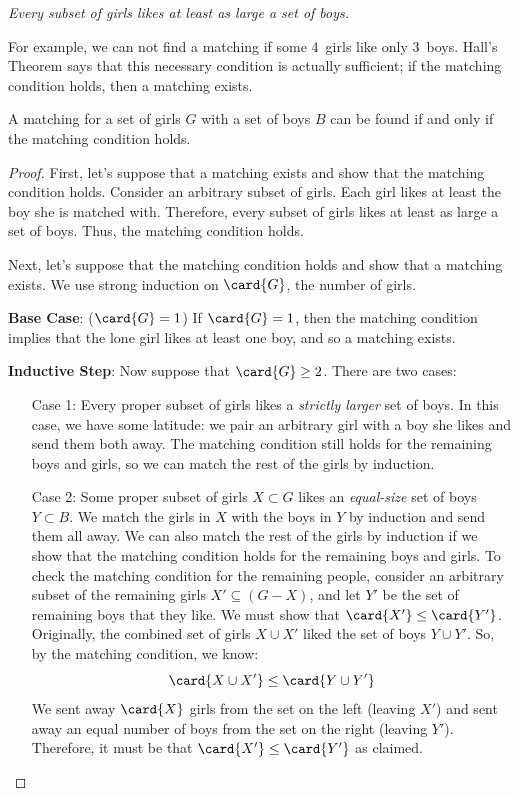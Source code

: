 \bigskip
\begin{center}
\emph{Every subset of girls likes at least as large a set of boys.}
\end{center}
\bigskip

For example, we can not find a matching if some 4~girls like only 3~boys.
Hall's Theorem says that this necessary condition is actually sufficient;
if the matching condition holds, then a matching exists.

\begin{theorem}
A matching for a set of girls $G$ with a set of boys $B$ can be found if
and only if the matching condition holds.
\end{theorem}

\begin{proof}
First, let's suppose that a matching exists and show that the matching condition
holds.  Consider an arbitrary subset of girls.  Each girl likes at least the boy she
is matched with.  Therefore, every subset of girls likes at least as large a set of
boys.  Thus, the matching condition holds.

Next, let's suppose that the matching condition holds and show that a matching
exists.  We use strong induction on $\card{G}$, the number of girls.

\textbf{Base Case}: ($\card{G}=1$) If $\card{G} = 1$, then the 
matching condition implies that the lone girl likes at least one boy, and so a
matching exists.

\textbf{Inductive Step}: Now suppose that $\card{G} \geq 2$.  There are two cases:

\begin{itemize}

\item[Case 1:] Every proper subset of girls likes a \emph{strictly larger} set of
  boys.  In this case, we have some latitude: we pair an arbitrary girl with a boy
  she likes and send them both away.  The matching condition still holds for the
  remaining boys and girls, so we can match the rest of the girls by induction.

\item[Case 2:] Some proper subset of girls $X \subset G$ likes an \emph{equal-size}
  set of boys $Y \subset B$.  We match the girls in $X$ with the boys in $Y$ by
  induction and send them all away.  We can also match the rest of the girls by
  induction if we show that the matching condition holds for the remaining boys and
  girls.  To check the matching condition for the remaining people, consider an
  arbitrary subset of the remaining girls $X' \subseteq (G - X)$, and let $Y'$ be the
  set of remaining boys that they like.  We must show that
  $\card{X'} \leq \card{Y'}$.  Originally, the combined set of girls $X \cup X'$
  liked the set of boys $Y \cup Y'$.  So, by the matching condition, we know:
%
\[
\card{X \cup X'}  \leq  \card{Y \cup Y'}
\]
%
We sent away $\card{X}$ girls from the set on the left (leaving $X'$) and sent away
an equal number of boys from the set on the right (leaving $Y'$).  Therefore, it must
be that $\card{X'}
\leq \card{Y'}$ as claimed.
\end{itemize}


\end{proof}
